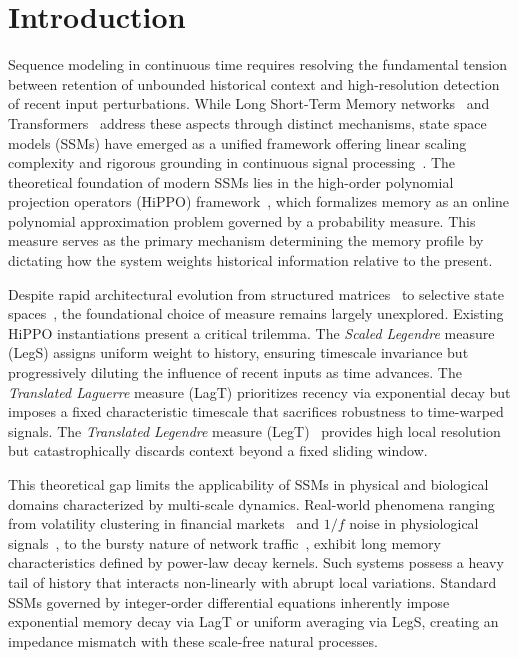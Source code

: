 \documentclass{article}
\theoremstyle{plain}
\theoremstyle{definition}
\theoremstyle{remark}
\begin{document}
\section{Introduction}
\label{sec:intro}
Sequence modeling in continuous time requires resolving the fundamental tension between retention of unbounded historical context and high-resolution detection of recent input perturbations. While Long Short-Term Memory networks~\citep{hochreiter1997long} and Transformers~\citep{vaswani2017attention} address these aspects through distinct mechanisms, state space models (SSMs) have emerged as a unified framework offering linear scaling complexity and rigorous grounding in continuous signal processing~\citep{gu2022efficiently, tay2021long}. The theoretical foundation of modern SSMs lies in the high-order polynomial projection operators (HiPPO) framework~\citep{gu2020hippo}, which formalizes memory as an online polynomial approximation problem governed by a probability measure. This measure serves as the primary mechanism determining the memory profile by dictating how the system weights historical information relative to the present.

Despite rapid architectural evolution from structured matrices~\citep{gu2022efficiently, gupta2022diagonal} to selective state spaces~\citep{gu2024mamba}, the foundational choice of measure remains largely unexplored. Existing HiPPO instantiations present a critical trilemma. The \textit{Scaled Legendre} measure (LegS) assigns uniform weight to history, ensuring timescale invariance but progressively diluting the influence of recent inputs as time advances. The \textit{Translated Laguerre} measure (LagT) prioritizes recency via exponential decay but imposes a fixed characteristic timescale that sacrifices robustness to time-warped signals. The \textit{Translated Legendre} measure (LegT)~\citep{voelker2019legendre} provides high local resolution but catastrophically discards context beyond a fixed sliding window.

This theoretical gap limits the applicability of SSMs in physical and biological domains characterized by multi-scale dynamics. Real-world phenomena ranging from volatility clustering in financial markets~\citep{mandelbrot1997multifractal} and $1/f$ noise in physiological signals~\citep{west2010fractal}, to the bursty nature of network traffic~\citep{leland1994self}, exhibit long memory characteristics defined by power-law decay kernels. Such systems possess a heavy tail of history that interacts non-linearly with abrupt local variations. Standard SSMs governed by integer-order differential equations inherently impose exponential memory decay via LagT or uniform averaging via LegS, creating an impedance mismatch with these scale-free natural processes.
\end{document}

